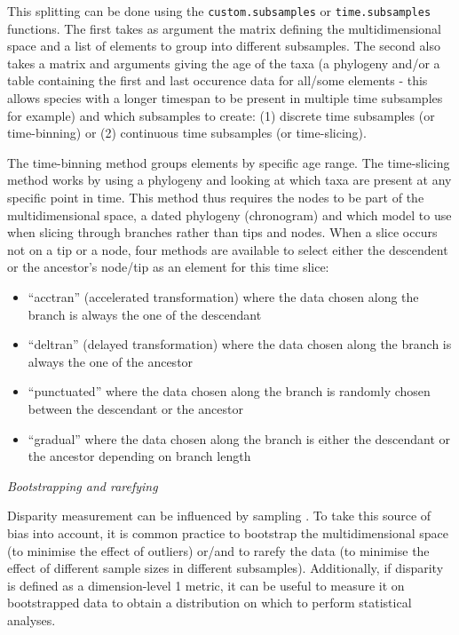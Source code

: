 \documentclass[12pt,letterpaper]{article}
\renewcommand{\subsection}[1]{%
\bigskip
\begin{center}
\begin{large}
\normalfont\itshape #1
\end{large}
\end{center}}
\begin{document}
This splitting can be done using the \texttt{custom.subsamples} or \texttt{time.subsamples} functions.
The first takes as argument the matrix defining the multidimensional space and a list of elements to group into different subsamples.
The second also takes a matrix and arguments giving the age of the taxa (a phylogeny and/or a table containing the first and last occurence data for all/some elements - this allows species with a longer timespan to be present in multiple time subsamples for example) and which subsamples to create: (1) discrete time subsamples (or time-binning) or (2) continuous time subsamples (or time-slicing).

The time-binning method groups elements by specific age range.
The time-slicing method works by using a phylogeny and looking at which taxa are present at any specific point in time.
This method thus requires the nodes to be part of the multidimensional space, a dated phylogeny (chronogram) and which model to use when slicing through branches rather than tips and nodes.
When a slice occurs not on a tip or a node, four methods are available to select either the descendent or the ancestor's node/tip as an element for this time slice:
\begin{itemize}
    \item ``acctran'' (accelerated transformation) where the data chosen along the branch is always the one of the descendant
    \item ``deltran'' (delayed transformation) where the data chosen along the branch is always the one of the ancestor
    \item ``punctuated'' where the data chosen along the branch is randomly chosen between the descendant or the ancestor
    \item ``gradual'' where the data chosen along the branch is either the descendant or the ancestor depending on branch length
\end{itemize}

\subsection{Bootstrapping and rarefying}
Disparity measurement can be influenced by sampling \citep{Butler2012}.
To take this source of bias into account, it is common practice to bootstrap the multidimensional space (to minimise the effect of outliers) or/and to rarefy the data (to minimise the effect of different sample sizes in different subsamples).
Additionally, if disparity is defined as a dimension-level 1 metric, it can be useful to measure it on bootstrapped data to obtain a distribution on which to perform statistical analyses.
\end{document}
